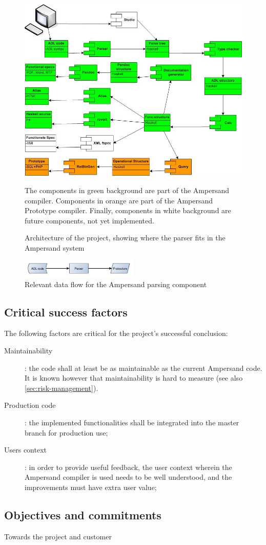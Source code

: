 \begin{figure}[h]
	\centering
	\includegraphics[width=\textwidth]{Figures/ADL_systeemarchitectuur}
	\caption[Architecture of the project]{Architecture of the project, showing where the parser fits in the Ampersand system}
	\label{fig:architecture}
	\small
	The components in green background are part of the Ampersand compiler.
	Components in orange are part of the Ampersand Prototype compiler.
	Finally, components in white background are future components, not yet implemented.
\end{figure}
%
\begin{figure}[h]
	\centering
	\includegraphics[width=0.5\textwidth]{Figures/Architecture}
	\caption{Relevant data flow for the Ampersand parsing component}
	\label{fig:data-flow}
\end{figure}

\subsection{Critical success factors}
The following factors are critical for the project's successful conclusion:
\begin{description}
	\item[Maintainability]: the code shall at least be as maintainable as the current Ampersand code.
		It is known however that maintainability is hard to measure (see also \autoref{sec:risk-management}).
	\item[Production code]: the implemented functionalities shall be integrated into the master branch for production use;
	\item[Users context]: in order to provide useful feedback, the user context wherein the Ampersand compiler is used needs to be well understood, and the improvements must have extra user value;
\end{description}

\subsection{Objectives and commitments}
Towards the project and customer
